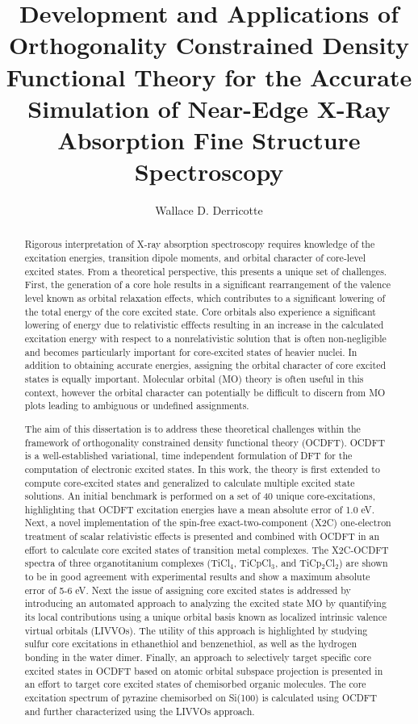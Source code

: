 \documentclass[final]{emory}
\title{Development and Applications of Orthogonality Constrained Density Functional Theory for the Accurate Simulation of Near-Edge X-Ray Absorption Fine Structure Spectroscopy}
\author{Wallace D. Derricotte}                      %
\begin{document}
\begin{abstract}
Rigorous interpretation of X-ray absorption spectroscopy requires knowledge of the excitation energies, transition dipole moments, and orbital character of core-level excited states. From a theoretical perspective, this presents a unique set of challenges. First, the generation of a core hole results in a significant rearrangement of the valence level known as orbital relaxation effects, which contributes to a significant lowering of the total energy of the core excited state. Core orbitals also experience a significant lowering of energy due to relativistic efffects resulting in an increase in the calculated excitation energy with respect to a nonrelativistic solution that is often non-negligible and becomes particularly important for core-excited states of heavier nuclei. In addition to obtaining accurate energies, assigning the orbital character of core excited states is equally important. Molecular orbital (MO) theory is often useful in this context, however the orbital character can potentially be difficult to discern from MO plots leading to ambiguous or undefined assignments. 

The aim of this dissertation is to address these theoretical challenges within the framework of orthogonality constrained density functional theory (OCDFT). OCDFT is a well-established variational, time independent formulation of DFT for the computation of electronic excited states. In this work, the theory is first extended to compute core-excited states and generalized to calculate multiple excited state solutions. An initial benchmark is performed on a set of 40 unique core-excitations, highlighting that OCDFT excitation energies have a mean absolute error of 1.0 eV. Next, a novel implementation of the spin-free exact-two-component (X2C) one-electron treatment of scalar relativistic effects is presented and combined with OCDFT in an effort to calculate core excited states of transition metal complexes. The X2C-OCDFT spectra of three organotitanium complexes (TiCl$_4$, TiCpCl$_3$, and TiCp$_2$Cl$_2$) are shown to be in good agreement with experimental results and show a maximum absolute error of 5-6 eV. Next the issue of assigning core excited states is addressed by introducing an automated approach to analyzing the excited state MO by quantifying its local contributions using a unique orbital basis known as localized intrinsic valence virtual orbitals (LIVVOs). The utility of this approach is highlighted by studying sulfur core excitations in ethanethiol and benzenethiol, as well as the hydrogen bonding in the water dimer. Finally, an approach to selectively target specific core excited states in OCDFT based on atomic orbital subspace projection is presented in an effort to target core excited states of chemisorbed organic molecules. The core excitation spectrum of pyrazine chemisorbed on Si(100) is calculated using OCDFT and further characterized using the LIVVOs approach.



\end{abstract}
\end{document}
